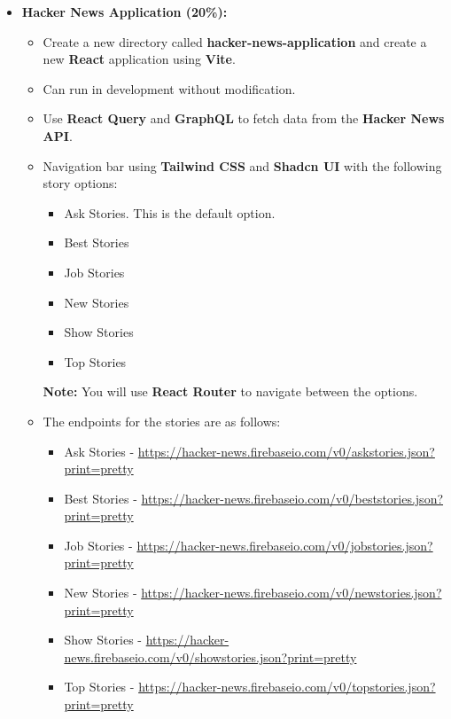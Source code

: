 \documentclass{article}
\begin{document}
	\begin{itemize}
	\item \textbf{Hacker News Application (20\%):}
	\begin{itemize}
		\item Create a new directory called \textbf{hacker-news-application} and create a new \textbf{React} application using \textbf{Vite}.
		\item Can run in development without modification.
		\item Use \textbf{React Query} and \textbf{GraphQL} to fetch data from the \textbf{Hacker News API}.
		\item Navigation bar using \textbf{Tailwind CSS} and \textbf{Shadcn UI} with the following story options:
		\begin{itemize}
			\item Ask Stories. This is the default option.
			\item Best Stories
			\item Job Stories
			\item New Stories
			\item Show Stories
			\item Top Stories
		\end{itemize}
		\textbf{Note:} You will use \textbf{React Router} to navigate between the options.
	\item The endpoints for the stories are as follows:
	\begin{itemize}
		\item Ask Stories - \href{https://hacker-news.firebaseio.com/v0/askstories.json?print=pretty}{https://hacker-news.firebaseio.com/v0/askstories.json?print=pretty}
		\item Best Stories - \href{https://hacker-news.firebaseio.com/v0/beststories.json?print=pretty}{https://hacker-news.firebaseio.com/v0/beststories.json?print=pretty}
		\item Job Stories - \href{https://hacker-news.firebaseio.com/v0/jobstories.json?print=pretty}{https://hacker-news.firebaseio.com/v0/jobstories.json?print=pretty}
		\item New Stories - \href{https://hacker-news.firebaseio.com/v0/newstories.json?print=pretty}{https://hacker-news.firebaseio.com/v0/newstories.json?print=pretty}
		\item Show Stories - \href{https://hacker-news.firebaseio.com/v0/showstories.json?print=pretty}{https://hacker-news.firebaseio.com/v0/showstories.json?print=pretty}
		\item Top Stories - \href{https://hacker-news.firebaseio.com/v0/topstories.json?print=pretty}{https://hacker-news.firebaseio.com/v0/topstories.json?print=pretty}

\end{itemize}
\end{itemize}
\end{itemize}
\end{document}
